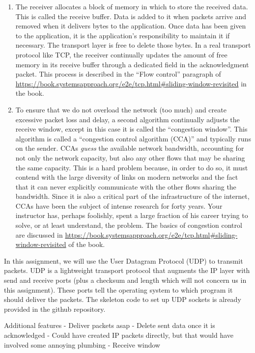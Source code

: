 \documentclass{article}
\begin{document}
\begin{enumerate}
\item The receiver allocates a block of memory in which to store the received data. This is called the receive buffer. Data is added to it when packets arrive and removed when it delivers bytes to the application. Once data has been given to the application, it is the application's responsibility to maintain it if necessary. The transport layer is free to delete those bytes. In a real transport protocol like TCP, the receiver continually updates the amount of free memory in its receive buffer through a dedicated field in the acknowledgment packet. This process is described in the ``Flow control'' paragraph of \hyperref[section 5.2.4]{https://book.systemsapproach.org/e2e/tcp.html#sliding-window-revisited} in the book.
\item To ensure that we do not overload the network (too much) and create excessive packet loss and delay, a second algorithm continually adjusts the receive window, except in this case it is called the ``congestion window''. This algorithm is called a ``congestion control algorithm (CCA)'' and typically runs on the sender. CCAs \emph{guess} the available network bandwidth, accounting for not only the network capacity, but also any other flows that may be sharing the same capacity. This is a hard problem because, in order to do so, it must contend with the large diversity of links on modern networks and the fact that it can never explicitly communicate with the other flows sharing the bandwidth. Since it is also a critical part of the infrastructure of the internet, CCAs have been the subject of intense research for forty years. Your instructor has, perhaps foolishly, spent a large fraction of his career trying to solve, or at least understand, the problem. The basics of congestion control are discussed in \hyperref[chapter 6]{https://book.systemsapproach.org/e2e/tcp.html#sliding-window-revisited} of the book.
\end{enumerate}

In this assignment, we will use the User Datagram Protocol (UDP) to transmit packets. UDP is a lightweight transport protocol that augments the IP layer with send and receive ports (plus a checksum and length which will not concern us in this assignment). These ports tell the operating system to which program it should deliver the packets. The skeleton code to set up UDP sockets is already provided in the github repository.

Additional features
- Deliver packets asap
- Delete sent data once it is acknowledged
- Could have created IP packets directly, but that would have involved some annoying plumbing
- Receive window
\end{document}
